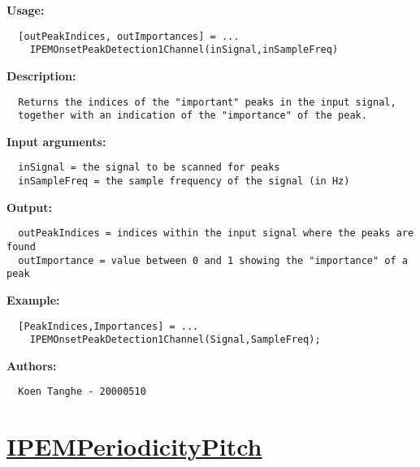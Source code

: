 \textbf{Usage:}
\begin{verbatim}  [outPeakIndices, outImportances] = ...
    IPEMOnsetPeakDetection1Channel(inSignal,inSampleFreq)

\end{verbatim}
\textbf{Description:}
\begin{verbatim}  Returns the indices of the "important" peaks in the input signal,
  together with an indication of the "importance" of the peak.

\end{verbatim}
\textbf{Input arguments:}
\begin{verbatim}  inSignal = the signal to be scanned for peaks
  inSampleFreq = the sample frequency of the signal (in Hz)

\end{verbatim}
\textbf{Output:}
\begin{verbatim}  outPeakIndices = indices within the input signal where the peaks are found
  outImportance = value between 0 and 1 showing the "importance" of a peak

\end{verbatim}
\textbf{Example:}
\begin{verbatim}  [PeakIndices,Importances] = ...
    IPEMOnsetPeakDetection1Channel(Signal,SampleFreq);

\end{verbatim}
\textbf{Authors:}
\begin{verbatim}  Koen Tanghe - 20000510
\end{verbatim}


\newpage
\section*{\hyperlink{Concepts:IPEMPeriodicityPitch}{IPEMPeriodicityPitch}}
\hypertarget{FuncRef:IPEMPeriodicityPitch}{}

